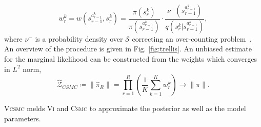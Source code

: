 \documentclass[accepted]{uai2021} %
\theoremstyle{definition}
\begin{document}
 \begin{equation}
 w_{r}^k = w(s_{r-1}^{a_{r-1}^k},s_{r}^k) = \frac{\pi(s_{r}^k)}{\pi(s_{r-1}^{a_{r-1}^k})}\cdot \frac{\nu^{-}(s_{r-1}^{a_{r-1}^k})}{q(s_{r}^k |s_{r-1}^{a_{r-1}^k})},
 \end{equation}
 where $\nu^{-}$ is a probability density over $\mathcal{S}$ correcting an over-counting problem~\citep{csmc}. An overview of the procedure is given in Fig. \ref{fig:trellis}. %
 An unbiased estimate for the marginal likelihood can be constructed from the weights which converges in $L^2$ norm,
\begin{equation}
    \widehat{\mathcal{Z}}_{CSMC} \coloneqq \|\widehat{\pi}_{R}\| = \prod\limits_{r=1}^{R}\left(\frac{1}{K} \sum\limits_{k=1}^{K}w_{r}^k\right) \rightarrow \|\pi \|.
    \label{eq:smcmarginallikelihood}
\end{equation}

\textsc{Vcsmc} melds \textsc{Vi} and \textsc{Csmc} to approximate the posterior as well as the model parameters.
\end{document}
